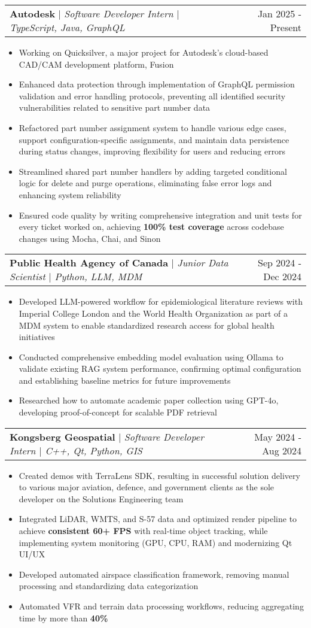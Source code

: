 \documentclass[letterpaper,10pt]{article}
\makeatletter
\newcommand{\resumeItem}[1]{
  \item\small{
    {#1 \vspace{-3pt}}
  }
}
\newcommand{\resumeSubheading}[3]{
    \item
    \begin{tabular*}{0.97\textwidth}[t]{l@{\extracolsep{\fill}}r}
      \textbf{#1} $|$ \textit{ #2} & #3 \\
    \end{tabular*}\vspace{-6pt}
}
\newcommand{\resumeItemListStart}{\begin{itemize}}
\newcommand{\resumeItemListEnd}{\end{itemize}\vspace{-5pt}}
\makeatother
\begin{document}
    \resumeSubheading{Autodesk}{Software Developer Intern $|$ TypeScript, Java, GraphQL}{Jan 2025 - Present}
        \resumeItemListStart
            \resumeItem{Working on Quicksilver, a major project for Autodesk's cloud-based CAD/CAM development platform, Fusion}
            \resumeItem{Enhanced data protection through implementation of GraphQL permission validation and error handling protocols, preventing all identified security vulnerabilities related to sensitive part number data}
            \resumeItem{Refactored part number assignment system to handle various edge cases, support configuration-specific assignments, and maintain data persistence during status changes, improving flexibility for users and reducing errors}
            \resumeItem{Streamlined shared part number handlers by adding targeted conditional logic for delete and purge operations, eliminating false error logs and enhancing system reliability}
            \resumeItem{Ensured code quality by writing comprehensive integration and unit tests for every ticket worked on, achieving \textbf{100\% test coverage} across codebase changes using Mocha, Chai, and Sinon}
    \resumeItemListEnd

    \resumeSubheading{Public Health Agency of Canada}{Junior Data Scientist $|$ Python, LLM, MDM}{Sep 2024 - Dec 2024}
      \resumeItemListStart
        \resumeItem{Developed LLM-powered workflow for epidemiological literature reviews with Imperial College London and the World Health Organization as part of a MDM system to enable standardized research access for global health initiatives}
        \resumeItem{Conducted comprehensive embedding model evaluation using Ollama to validate existing RAG system performance, confirming optimal configuration and establishing baseline metrics for future improvements}
        \resumeItem{Researched how to automate academic paper collection using GPT-4o, developing proof-of-concept for scalable PDF retrieval}
      \resumeItemListEnd

    \resumeSubheading{Kongsberg Geospatial}{Software Developer Intern $|$ C++, Qt, Python, GIS}{May 2024 - Aug 2024}
      \resumeItemListStart
        \resumeItem{Created demos with TerraLens SDK, resulting in successful solution delivery to various major aviation, defence, and government clients as the sole developer on the Solutions Engineering team}
        \resumeItem{Integrated LiDAR, WMTS, and S-57 data and optimized render pipeline to achieve \textbf{consistent 60+ FPS} with real-time object tracking, while implementing system monitoring (GPU, CPU, RAM) and modernizing Qt UI/UX}
        \resumeItem{Developed automated airspace classification framework, removing manual processing and standardizing data categorization}
        \resumeItem{Automated VFR and terrain data processing workflows, reducing aggregating time by more than \textbf{40\%}}
      \resumeItemListEnd
\end{document}
